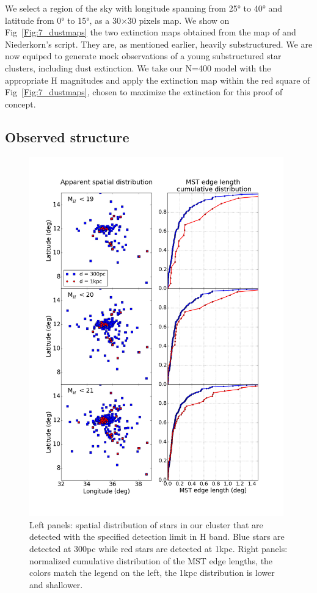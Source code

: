 We select a region of the sky with longitude spanning from 25° to 40° and latitude from 0° to 15°, as a 30$\times$30 pixels map. We show on Fig~\ref{Fig:7_dustmaps} the two extinction maps obtained from the map of \cite{Green2015} and Niederkorn's script. They are, as mentioned earlier, heavily substructured. We are now equiped to generate mock observations of a young substructured star clusters, including dust extinction. We take our \HubLem N=400 model with the appropriate H magnitudes and apply the extinction map within the red square of Fig~\ref{Fig:7_dustmaps}, chosen to maximize the extinction for this proof of concept.

\subsection*{Observed structure}


\begin{figure}
\begin{center}
\includegraphics[width=0.98\textwidth]{Figures/7_MSTedge.png}
\end{center}
\caption[Influence of extinction on cumulative distribution of MST edges]{Left panels: spatial distribution of  stars in our cluster that are detected with the specified detection limit in H band. Blue stars are detected at 300pc while red stars are detected at 1kpc. Right panels: normalized cumulative distribution of the MST edge lengths, the colors match the legend on the left, the 1kpc distribution is lower and shallower.}
\label{Fig:7_MSTedge}
\end{figure} 


